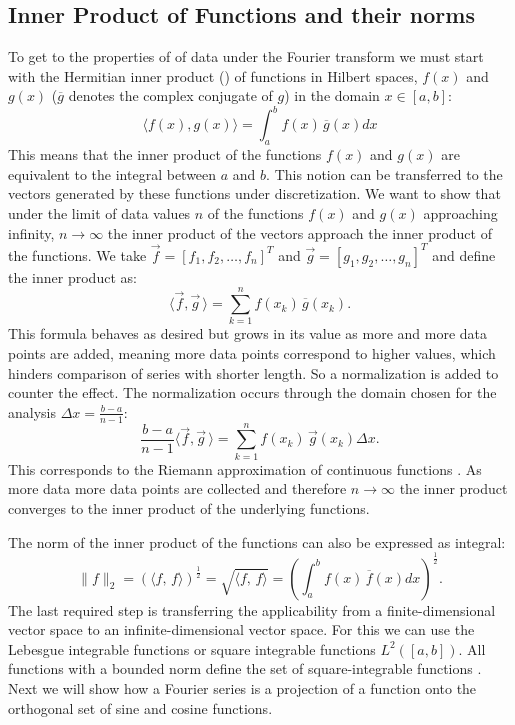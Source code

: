 \documentclass[phd,black, hidelinks]{PrincetonThesis}
\newcommand{\compconj}[1]{\overline{#1}}
\begin{document}
\subsection{Inner Product of Functions and their norms}
\label{sec:org4ae6f6f}
To get to the properties of of data under the Fourier transform we must start with the Hermitian inner product (\cite{ratcliffe2006foundations}) of functions in Hilbert spaces, \(f(x)\) and \(g(x)\) (\(\compconj{g}\) denotes the complex conjugate of \(g\)) in the domain \(x \in [a,b]\):
\begin{equation}
\langle f(x),g(x) \rangle = \int_a^b f(x) \, \compconj{g}(x)dx
\end{equation}
This means that the inner product of the functions \(f(x)\) and \(g(x)\) are equivalent to the integral between \(a\) and \(b\). This notion can be transferred to the vectors generated by these functions under discretization. We want to show that under the limit of data values \(n\) of the functions \(f(x)\) and \(g(x)\) approaching infinity, \(n \to \infty\) the inner product of the vectors approach the inner product of the functions. We take \(\vec{f} = [f_1, f_2, \dots, f_n]^T\) and \(\vec{g}= [g_1, g_2, \dots, g_n]^T\) and define the inner product as:
\begin{equation}
\langle\vec{f},\vec{g}\,\rangle = \sum_{k=1}^n f(x_k) \, \compconj{g}(x_k).
\end{equation}
This formula behaves as desired but grows in its value as more and more data points are added, meaning more data points correspond to higher values, which hinders comparison of series with shorter length. So a normalization is added to counter the effect. The normalization occurs through the domain chosen for the analysis \(\Delta x = \frac{b-a}{n-1}\):
\begin{equation}
\frac{b-a}{n-1} \langle\vec{f},\vec{g}\, \rangle =\sum_{k=1}^n f(x_k) \, \vec{g}(x_k)\Delta x.
\end{equation}
This corresponds to the Riemann approximation of continuous functions \cite{anton1998calculus}. As more data more data points are collected and therefore \(n \to \infty\) the inner product converges to the inner product of the underlying functions.

The norm of the inner product of the functions can also be expressed as integral:
\begin{equation}
\|f\|_2 = (\langle f,\, f\rangle)^{\frac{1}{2}} = \sqrt{\langle f, \, f \rangle} = \left( \int_a^b f(x) \, \compconj{f}(x)dx  \right)^{\frac{1}{2}}.
\end{equation}
The last required step is transferring the applicability from a finite-dimensional vector space to an infinite-dimensional vector space. For this we can use the Lebesgue integrable functions or square integrable functions \(L^2([a,b])\). All functions with a bounded norm define the set of square-integrable functions \cite{brunton2019data}. Next we will show how a Fourier series is a projection of a function onto the orthogonal set of sine and cosine functions.
\end{document}
